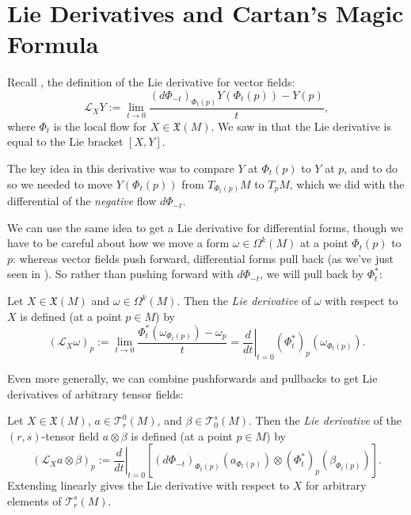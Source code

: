 
\section{Lie Derivatives and Cartan's Magic Formula}

Recall , the definition of the Lie derivative for vector fields:
\[
	\mathcal{L}_XY := \lim_{t \to 0} \frac{(d\Phi_{-t})_{\Phi_t(p)}Y(\Phi_t(p))-Y(p)}{t},
\]
where $\Phi_t$ is the local flow for $X \in \mathfrak{X}(M)$. We saw in  that the Lie derivative is equal to the Lie bracket $[X,Y]$.

The key idea in this derivative was to compare $Y$ at $\Phi_t(p)$ to $Y$ at $p$, and to do so we needed to move $Y(\Phi_t(p))$ from $T_{\Phi_t(p)}M$ to $T_pM$, which we did with the differential of the \emph{negative} flow $d\Phi_{-t}$.

We can use the same idea to get a Lie derivative for differential forms, though we have to be careful about how we move a form $\omega \in \Omega^k(M)$ at a point $\Phi_t(p)$ to $p$: whereas vector fields push forward, differential forms pull back (as we've just seen in ). So rather than pushing forward with $d\Phi_{-t}$, we will pull back by $\Phi_t^\ast$:

\begin{definition}\label{def:Lie derivative of differential form}
	Let $X \in \mathfrak{X}(M)$ and $\omega \in \Omega^k(M)$. Then the \emph{Lie derivative} of $\omega$ with respect to $X$ is defined (at a point $p \in M$) by
	\[
		\left(\mathcal{L}_X\omega\right)_p := \lim_{t \to 0} \frac{\Phi_t^\ast(\omega_{\Phi_t(p)})-\omega_p}{t} = \left. \frac{d}{dt}\right|_{t=0} \left(\Phi_t^\ast\right)_p(\omega_{\Phi_t(p)}).
	\]
\end{definition}

Even more generally, we can combine pushforwards and pullbacks to get Lie derivatives of arbitrary tensor fields:

\begin{definition}\label{def:Lie derivative of tensor fields}
	Let $X \in \mathfrak{X}(M)$, $a \in \mathcal{T}_r^0(M)$, and $\beta \in \mathcal{T}_0^s(M)$. Then the \emph{Lie derivative} of the $(r,s)$-tensor field $a \otimes \beta$ is defined (at a point $p \in M$) by
	\[
		\left( \mathcal{L}_X a \otimes \beta\right)_p := \left. \frac{d}{dt} \right|_{t=0} \left[ \left(d\Phi_{-t}\right)_{\Phi_t(p)} \left(a _{\Phi_t(p)} \right) \otimes \left(\Phi_t^\ast\right)_p\left(\beta_{\Phi_t(p)}\right)\right].
	\]
	Extending linearly gives the Lie derivative with respect to $X$ for arbitrary elements of $\mathcal{T}_r^s(M)$.
\end{definition}

